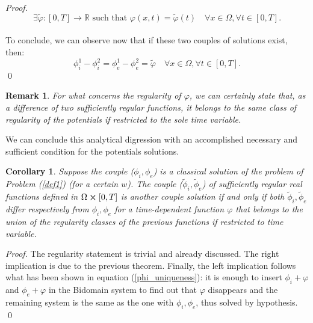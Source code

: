 \documentclass[a4paper,11pt]{article}
\newtheorem*{remark}{Remark}
\newtheorem{corollary}{Corollary}
\begin{document}
\begin{proof}
	\begin{equation*}
	\exists \tilde{\varphi}:[0,T]\rightarrow \mathbb{R} \text{ such that } \varphi(x,t) = \tilde{\varphi}(t) \quad \forall x \in \Omega,\forall t \in [0,T].
	\end{equation*}\\
	To conclude, we can observe now that if these two couples of solutions exist, then:
	\begin{equation*}
	\phi_i^1-\phi_i^2 = \phi_e^1-\phi_e^2=\tilde{\varphi} \quad \forall x \in \Omega, \forall t \in [0,T].
	\end{equation*} \qed
\end{proof}

\begin{remark}
For what concerns the regularity of $\varphi$, we can certainly state that, as a difference of two sufficiently regular functions, it belongs to the same class of regularity of the potentials if restricted to the sole time variable.
\end{remark}

\vspace{4mm}
\noindent We can conclude this analytical digression with an accomplished necessary and sufficient condition for the potentials solutions. \vspace{4mm}

\begin{corollary}
Suppose the couple ($\phi_i,\phi_e$) is a classical solution of the problem of Problem (\ref{def1}) (for a certain $w$). The couple ($\tilde{\phi}_i,\tilde{\phi}_e$) of sufficiently regular real functions defined in $\Omega\cross[0,T]$ is another couple solution if and only if both $\tilde{\phi}_i,\tilde{\phi}_e$ differ respectively from $\phi_i,\phi_e$ for a time-dependent function $\varphi$ that belongs to the union of the regularity classes of the previous functions if restricted to time variable.
\end{corollary}

\begin{proof}
	The regularity statement is trivial and already discussed. The right implication is due to the previous theorem. Finally, the left implication follows what has been shown in equation (\ref{phi_uniqueness}): it is enough to insert $\phi_i+\varphi$ and $\phi_e+\varphi$ in the Bidomain system to find out that $\varphi$ disappears and the remaining system is the same as the one with $\phi_i,\phi_e$, thus solved by hypothesis. \qed
\end{proof}
\end{document}
